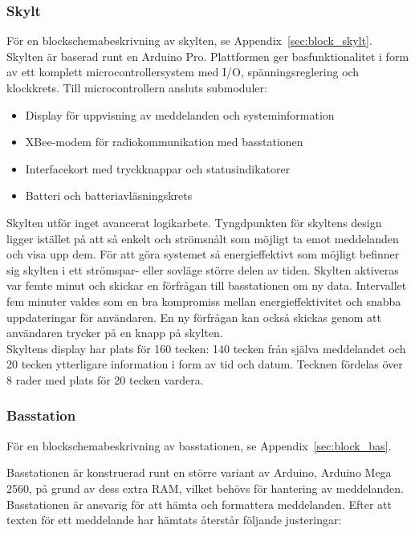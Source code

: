 \documentclass[a4paper,11pt]{article}
\begin{document}
\subsubsection{Skylt}
\label{sec:skylt_section}
För en blockschemabeskrivning av skylten, se Appendix~\ref{sec:block_skylt}.
Skylten är baserad runt en Arduino Pro. Plattformen ger basfunktionalitet i form av ett komplett microcontrollersystem med I/O, spänningsreglering och klockkrets. Till microcontrollern ansluts submoduler:
	
	\begin{itemize}
    	\item Display för uppvisning av meddelanden och systeminformation
    	\item XBee-modem för radiokommunikation med basstationen
    	\item Interfacekort med tryckknappar och statusindikatorer
    	\item Batteri och batteriavläsningskrets
	\end{itemize}
	
Skylten utför inget avancerat logikarbete. Tyngdpunkten för skyltens design ligger istället på att så enkelt och strömsnålt som möjligt ta emot meddelanden och visa upp dem. För att göra systemet så energieffektivt som möjligt befinner sig skylten i ett strömspar- eller sovläge större delen av tiden. Skylten aktiveras var femte minut och skickar en förfrågan till basstationen om ny data. Intervallet fem minuter valdes som en bra kompromiss mellan energieffektivitet och snabba uppdateringar för användaren. En ny förfrågan kan också skickas genom att användaren trycker på en knapp på skylten.\\

Skyltens display har plats för 160 tecken: 140 tecken från själva meddelandet och 20 tecken ytterligare information i form av tid och datum. Tecknen fördelas över 8 rader med plats för 20 tecken vardera.

\subsubsection{Basstation}
För en blockschemabeskrivning av basstationen, se Appendix~\ref{sec:block_bas}.

Basstationen är konstruerad runt en större variant av Arduino, Arduino Mega 2560, på grund av dess extra RAM, vilket behövs för hantering av meddelanden. Basstationen är ansvarig för att hämta och formattera meddelanden. Efter att texten för ett meddelande har hämtats återstår följande justeringar:
	
\end{document}
